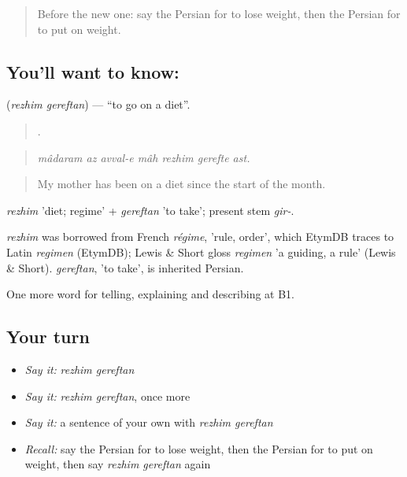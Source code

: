\label{lesson:FA-C498-rezhim-gereftan}



\begin{quote}
Before the new one: say the Persian for to lose weight, then the Persian for to put on weight.
\end{quote}

\subsection*{You'll want to know:  }
\textbf{ } (\emph{rezhim gereftan}) — \textquotedblleft{}to go on a diet\textquotedblright{}.

\begin{quote}
      .
\end{quote}

\begin{quote}
\emph{mâdaram az avval-e mâh rezhim gerefte ast.}
\end{quote}

\begin{quote}
My mother has been on a diet since the start of the month.
\end{quote}

\emph{rezhim} 'diet; regime' + \emph{gereftan} 'to take'; present stem \emph{gir-}.

\begin{cousinweb}
\emph{rezhim} was borrowed from French \emph{régime}, 'rule, order', which EtymDB traces to Latin \emph{regimen} (EtymDB); Lewis \& Short gloss \emph{regimen} 'a guiding, a rule' (Lewis \& Short). \emph{gereftan}, 'to take', is inherited Persian.
\end{cousinweb}

\begin{grammarlens}[title={What you've built}]
One more word for telling, explaining and describing at B1.
\end{grammarlens}

\subsection*{Your turn}
\begin{itemize}
\raggedright
  \item \emph{Say it:} \emph{rezhim gereftan}
  \item \emph{Say it:} \emph{rezhim gereftan}, once more
  \item \emph{Say it:} a sentence of your own with \emph{rezhim gereftan}
  \item \emph{Recall:} say the Persian for to lose weight, then the Persian for to put on weight, then say \emph{rezhim gereftan} again
\end{itemize}

